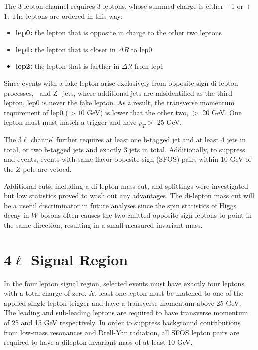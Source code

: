 The 3 lepton channel requires 3 leptons, whose summed charge is either
$-$1 or $+$1. The leptons are ordered in this way:

\begin{itemize}
\item \textbf{lep0:} the lepton that is opposite in charge to the other two leptons
\item \textbf{lep1:} the lepton that is closer in $\Delta R$ to lep0
\item \textbf{lep2:} the lepton that is farther in $\Delta R$ from lep1
\end{itemize}

Since events with a fake lepton arise exclusively from opposite sign di-lepton processes, \ttbar\ and Z+jets, where additional jets are 
misidentified as the third lepton, lep0 is never the fake lepton. As a result, the transverse momentum 
requirement of lep0 ($> 10$ GeV) is lower that the other two, $>$ 20 GeV.  One lepton must
must match a trigger and have $p_T >$ 25 GeV. 

The 3$\ell$ channel further requires at least one b-tagged jet and at least 4 jets in total, or two b-tagged jets and exactly 3 jets in 
total. Additionally, to suppress \WZ and \zj events, events with same-flavor opposite-sign (SFOS) pairs
within 10 GeV of the $Z$ pole are vetoed.

Additional cuts, including a di-lepton mass cut, and splittings were investigated but low statistics proved to wash out any advantages.
The di-lepton mass cut will be a useful discriminator in future analyses since the spin statistics of Higgs decay in $W$ bosons often
causes the two emitted opposite-sign leptons to point in the same direction, resulting in a small measured invariant mass. 

\section{4$\ell$ Signal Region}

In the four lepton signal region, selected events must have exactly four leptons with a total charge of zero. 
At least one lepton must be matched to one of the applied single lepton trigger and have a transverse momentum above 25 GeV. 
The leading and sub-leading leptons are required to have transverse momentum of 25 and 15 GeV respectively. 
In order to suppress background contributions from low-mass resonances and Drell-Yan radiation, all SFOS lepton pairs are required to have a dilepton invariant mass of at least 10 GeV. 

